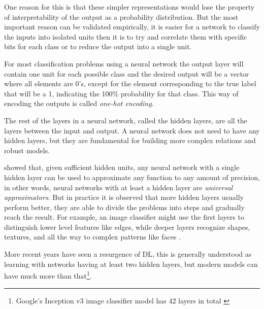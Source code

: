 One reason for this is that these simpler representations would lose the property of interpretability of the output as a probability distribution. But the most important reason can be validated empirically, it is easier for a network to classify the inputs into isolated units then it is to try and correlate them with specific bits for each class \cite[Chapter 1]{NN&DL2015} or to reduce the output into a single unit.

For most classification problems using a neural network the output layer will contain one unit for each possible class and the desired output will be a vector where all elements are 0's, except for the element corresponding to the true label that will be a 1, indicating the 100\% probability for that class. This way of encoding the outputs is called \textit{one-hot encoding}.


The rest of the layers in a neural network, called the hidden layers, are all the layers between the input and output. A neural network does not need to have any hidden layers, but they are fundamental for building more complex relations and robust models.

\textcite{universalApproximator1989} showed that, given sufficient hidden units, any neural network with a single hidden layer can be used to approximate any function to any amount of precision, in other words, neural networks with at least a hidden layer are \textit{universal approximators}. But in practice it is observed that more hidden layers usually perform better, they are able to divide the problems into steps and gradually reach the result. For example, an image classifier might use the first layers to distinguish lower level features like edges, while deeper layers recognize shapes, textures, and all the way to complex patterns like faces \cite{deepLearningBook2016}.

More recent years have seen a resurgence of \gls{DL}, this is generally understood as learning with networks having at least two hidden layers, but modern models can have much more than that\footnote{
    Google's Inception v3 image classifier model has 42 layers in total \cite{inceptionV3_2015}
}.


